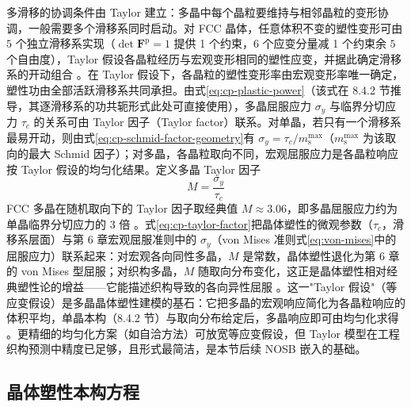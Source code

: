 多滑移的协调条件由 Taylor 建立：多晶中每个晶粒要维持与相邻晶粒的变形协调，一般需要多个滑移系同时启动。对 FCC 晶体，任意体积不变的塑性变形可由 $5$ 个独立滑移系实现（$\det\mathbf{F}^{\mathrm{p}}=1$ 提供 1 个约束，$6$ 个应变分量减 1 个约束余 $5$ 个自由度），Taylor 假设各晶粒经历与宏观变形相同的塑性应变，并据此确定滑移系的开动组合 \cite{Taylor1938}。在 Taylor 假设下，各晶粒的塑性变形率由宏观变形率唯一确定，塑性功由全部活跃滑移系共同承担。由式\eqref{eq:cp-plastic-power}（该式在 8.4.2 节推导，其逐滑移系的功共轭形式此处可直接使用），多晶屈服应力 $\sigma_{y}$ 与临界分切应力 $\tau_{c}$ 的关系可由 Taylor 因子（Taylor factor）联系。对单晶，若只有一个滑移系最易开动，则由式\eqref{eq:cp-schmid-factor-geometry}有 $\sigma_{y}=\tau_{c}/m^{\max}_{\mathrm{s}}$（$m^{\max}_{\mathrm{s}}$ 为该取向的最大 Schmid 因子）；对多晶，各晶粒取向不同，宏观屈服应力是各晶粒响应按 Taylor 假设的均匀化结果。定义多晶 Taylor 因子
\begin{equation}
  M=\frac{\sigma_{y}}{\tau_{c}}
  \label{eq:cp-taylor-factor}
\end{equation}
FCC 多晶在随机取向下的 Taylor 因子取经典值 $M\approx3.06$，即多晶屈服应力约为单晶临界分切应力的 $3$ 倍 \cite{Taylor1938,Kalidindi1992}。式\eqref{eq:cp-taylor-factor}把晶体塑性的微观参数（$\tau_{c}$，滑移系层面）与第 6 章宏观屈服准则中的 $\sigma_{y}$（von Mises 准则式\eqref{eq:von-mises}中的屈服应力）联系起来：对宏观各向同性多晶，$M$ 是常数，晶体塑性退化为第 6 章的 von Mises 型屈服；对织构多晶，$M$ 随取向分布变化，这正是晶体塑性相对经典塑性论的增益——它能描述织构导致的各向异性屈服 \cite{Kalidindi1992,Roters2010}。这一"Taylor 假设"（等应变假设）是多晶晶体塑性建模的基石：它把多晶的宏观响应简化为各晶粒响应的体积平均，单晶本构（8.4.2 节）与取向分布给定后，多晶响应即可由均匀化求得 \cite{Kalidindi1992,Roters2010}。更精细的均匀化方案（如自洽方法）可放宽等应变假设，但 Taylor 模型在工程织构预测中精度已足够，且形式最简洁，是本节后续 NOSB 嵌入的基础。

\subsection{晶体塑性本构方程}\label{sec:cp-constitutive}

